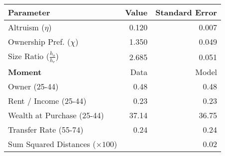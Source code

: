 \begin{tabular}{lrr}
\toprule   
 \textbf{Parameter} & Value & Standard Error\\
\midrule
Altruism ($\eta$) & 0.120 & 0.007\\
Ownership Pref. ($\chi$) & 1.350 & 0.049\\
Size Ratio ($\frac{h_o}{h_r}$) & 2.685 & 0.051\\
\cmidrule(lr){1-3} 

 
\textbf{Moment} & Data & Model\\
\midrule
Owner (25-44) & 0.48 & 0.48\\
Rent / Income (25-44) & 0.23 & 0.23\\
Wealth at Purchase (25-44) & 37.14 & 36.75\\
Transfer Rate (55-74) & 0.24 & 0.24\\
\midrule 
 Sum Squared Distances ($ \times 100$) &  & 0.02\\
\bottomrule
\end{tabular}
